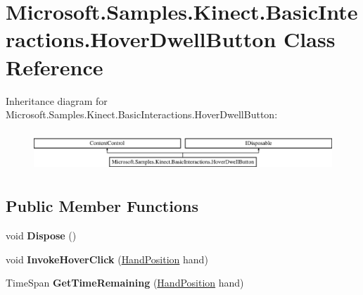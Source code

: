 \hypertarget{class_microsoft_1_1_samples_1_1_kinect_1_1_basic_interactions_1_1_hover_dwell_button}{\section{Microsoft.\-Samples.\-Kinect.\-Basic\-Interactions.\-Hover\-Dwell\-Button Class Reference}
\label{class_microsoft_1_1_samples_1_1_kinect_1_1_basic_interactions_1_1_hover_dwell_button}
}
Inheritance diagram for Microsoft.\-Samples.\-Kinect.\-Basic\-Interactions.\-Hover\-Dwell\-Button\-:\begin{figure}[H]
\begin{center}
\leavevmode
\includegraphics[height=1.521739cm]{class_microsoft_1_1_samples_1_1_kinect_1_1_basic_interactions_1_1_hover_dwell_button}
\end{center}
\end{figure}
\subsection*{Public Member Functions}
\begin{DoxyCompactItemize}
\item 
\hypertarget{class_microsoft_1_1_samples_1_1_kinect_1_1_basic_interactions_1_1_hover_dwell_button_a701e115f01841afdd8389bf3f3ac0e61}{void {\bfseries Dispose} ()}\label{class_microsoft_1_1_samples_1_1_kinect_1_1_basic_interactions_1_1_hover_dwell_button_a701e115f01841afdd8389bf3f3ac0e61}

\item 
\hypertarget{class_microsoft_1_1_samples_1_1_kinect_1_1_basic_interactions_1_1_hover_dwell_button_a4175a54400eaf695ba5257d3887307b6}{void {\bfseries Invoke\-Hover\-Click} (\hyperlink{class_microsoft_1_1_samples_1_1_kinect_1_1_basic_interactions_1_1_hand_position}{Hand\-Position} hand)}\label{class_microsoft_1_1_samples_1_1_kinect_1_1_basic_interactions_1_1_hover_dwell_button_a4175a54400eaf695ba5257d3887307b6}

\item 
\hypertarget{class_microsoft_1_1_samples_1_1_kinect_1_1_basic_interactions_1_1_hover_dwell_button_a38d196b1d147adccc3681a486fc2c516}{Time\-Span {\bfseries Get\-Time\-Remaining} (\hyperlink{class_microsoft_1_1_samples_1_1_kinect_1_1_basic_interactions_1_1_hand_position}{Hand\-Position} hand)}\label{class_microsoft_1_1_samples_1_1_kinect_1_1_basic_interactions_1_1_hover_dwell_button_a38d196b1d147adccc3681a486fc2c516}

\end{DoxyCompactItemize}

